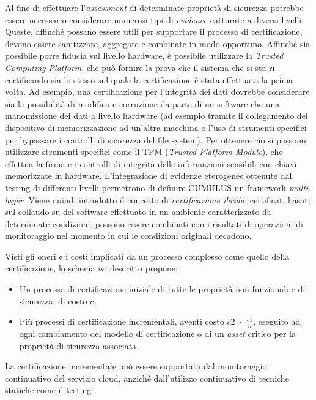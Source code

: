 \documentclass[../main.tex]{subfiles}
\begin{document}
Al fine di effettuare l'\textit{assessment} di determinate proprietà di sicurezza potrebbe essere necessario considerare numerosi tipi di \textit{evidence} catturate a diversi livelli. Queste, affinché possano essere utili per supportare il processo di certificazione, devono essere sanitizzate, aggregate e combinate in modo opportuno.
Affinché sia possibile porre fiducia sul livello hardware, è possibile utilizzare la \textit{Trusted Computing Platform}, che può fornire la prova che il sistema che si sta ri-certificando sia lo stesso sul quale la certificazione è stata effettuata la prima volta. 
Ad esempio, una certificazione per l'integrità dei dati dovrebbe considerare sia la possibilità di modifica e corruzione da parte di un software che una manomissione dei dati a livello hardware (ad esempio tramite il collegamento del dispositivo di memorizzazione ad un'altra macchina o l'uso di strumenti specifici per bypassare i controlli di sicurezza del file system).
Per ottenere ciò si possono utilizzare strumenti specifici come il TPM (\textit{Trusted Platform Module}), che effettua la firma e i controlli di integrità delle informazioni sensibili con chiavi memorizzate in hardware.
L'integrazione di evidenze eterogenee ottenute dal testing di differenti livelli permettono di definire CUMULUS un framework \textit{multi-layer}.
Viene quindi introdotto il concetto di \textit{certificazione ibrida}: certificati basati sul collaudo su del software effettuato in un ambiente caratterizzato da determinate condizioni, possono essere combinati con i risultati di operazioni di monitoraggio nel momento in cui le condizioni originali decadono.\cite{SpanoudakisDamiani}

Visti gli oneri e i costi implicati da un processo complesso come quello della certificazione, lo schema ivi descritto propone:
\begin{itemize}
\item Un processo di certificazione iniziale di tutte le proprietà non funzionali e di sicurezza, di costo $c_1$
\item Più processi di certificazione incrementali, aventi costo $c2 \sim\frac{c1}{n}$, eseguito ad ogni cambiamento del modello di certificazione o di un \textit{asset} critico per la proprietà di sicurezza associata.
\end{itemize}
La certificazione incrementale può essere supportata dal monitoraggio continuativo del servizio cloud, anziché dall'utilizzo continuativo di tecniche statiche come il testing \cite{Dempsey}.%
\end{document}
